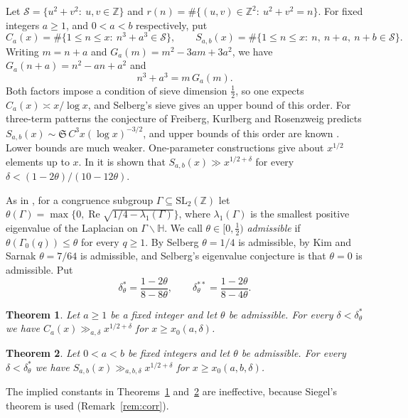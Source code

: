 \documentclass[11pt]{amsart}
\newtheorem{theorem}{Theorem}[section]
\theoremstyle{remark}
\theoremstyle{definition}
\numberwithin{equation}{section}
\newcommand{\Sc}{\mathcal{S}}
\newcommand{\Z}{\mathbb{Z}}
\begin{document}
Let $\Sc=\{u^2+v^2:\ u,v\in\Z\}$ and $r(n)=\#\{(u,v)\in\Z^2:\ u^2+v^2=n\}$. For fixed integers $a\ge1$, and $0<a<b$ respectively, put
\[
C_a(x)=\#\{1\le n\le x:\ n^3+a^3\in\Sc\},\qquad S_{a,b}(x)=\#\{1\le n\le x:\ n,\ n+a,\ n+b\in\Sc\}.
\]
Writing $m=n+a$ and $G_a(m)=m^2-3am+3a^2$, we have $G_a(n+a)=n^2-an+a^2$ and
\begin{equation}\label{eq:cubefactor}
n^3+a^3=m\,G_a(m).
\end{equation}
Both factors impose a condition of sieve dimension $\frac12$, so one expects $C_a(x)\asymp x/\log x$, and Selberg's sieve gives an upper bound of this order. For three-term patterns the conjecture of Freiberg, Kurlberg and Rosenzweig \cite[Conjecture~1.1]{FKR} predicts $S_{a,b}(x)\sim\mathfrak S\,C^3x(\log x)^{-3/2}$, and upper bounds of this order are known \cite{CD,No}. Lower bounds are much weaker. One-parameter constructions give about $x^{1/2}$ elements up to $x$. In \cite{IC} it is shown that $S_{a,b}(x)\gg x^{1/2+\delta}$ for every $\delta<(1-2\theta)/(10-12\theta)$.

As in \cite{IC}, for a congruence subgroup $\Gamma\subseteq\mathrm{SL}_2(\Z)$ let $\theta(\Gamma)=\max\{0,\operatorname{Re}\sqrt{1/4-\lambda_1(\Gamma)}\}$, where $\lambda_1(\Gamma)$ is the smallest positive eigenvalue of the Laplacian on $\Gamma\backslash\mathbb H$. We call $\theta\in[0,\frac12)$ \emph{admissible} if $\theta(\Gamma_0(q))\le\theta$ for every $q\ge1$. By Selberg \cite{Sel} $\theta=1/4$ is admissible, by Kim and Sarnak \cite[Appendix~2]{Kim} $\theta=7/64$ is admissible, and Selberg's eigenvalue conjecture is that $\theta=0$ is admissible. Put
\[
\delta^*_\theta=\frac{1-2\theta}{8-8\theta},\qquad\delta^{**}_\theta=\frac{1-2\theta}{8-4\theta}.
\]

\begin{theorem}\label{thm:cubes}
Let $a\ge1$ be a fixed integer and let $\theta$ be admissible. For every $\delta<\delta^*_\theta$ we have $C_a(x)\gg_{a,\delta}x^{1/2+\delta}$ for $x\ge x_0(a,\delta)$.
\end{theorem}

\begin{theorem}\label{thm:triples}
Let $0<a<b$ be fixed integers and let $\theta$ be admissible. For every $\delta<\delta^*_\theta$ we have $S_{a,b}(x)\gg_{a,b,\delta}x^{1/2+\delta}$ for $x\ge x_0(a,b,\delta)$.
\end{theorem}

The implied constants in Theorems~\ref{thm:cubes} and~\ref{thm:triples} are ineffective, because Siegel's theorem is used (Remark~\ref{rem:corr}).
\end{document}
